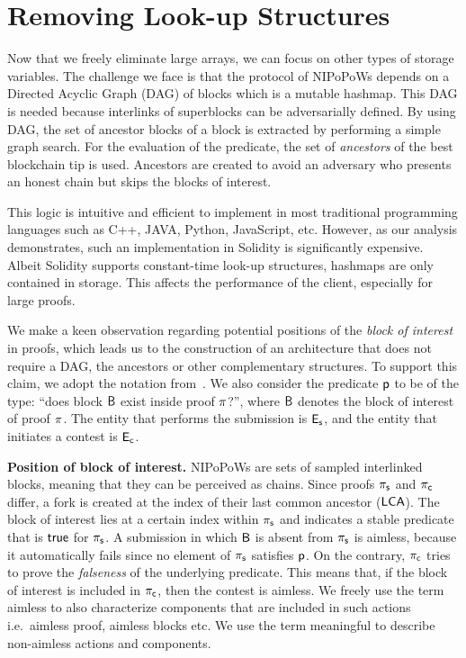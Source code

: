 \section{Removing Look-up Structures}

Now that we freely eliminate large arrays, we can focus on other
types of storage variables. The challenge we face is that the protocol of
NIPoPoWs depends on a Directed Acyclic Graph (DAG) of blocks which is a
mutable hashmap. This DAG is needed because interlinks of superblocks can be
adversarially defined. By using DAG, the set of ancestor blocks of a block is
extracted by performing a simple graph search. For the evaluation of the
predicate, the set of \emph{ancestors} of the best blockchain tip is used.
Ancestors are created to avoid an adversary who presents an honest chain but
skips the blocks of interest.

This logic is intuitive and efficient to implement in most traditional
programming languages such as C++, JAVA, Python, JavaScript, etc. However, as
our analysis demonstrates, such an implementation in Solidity is significantly
expensive. Albeit Solidity supports constant-time look-up structures, hashmaps
are only contained in storage. This affects the performance of the client,
especially for large proofs.

We make a keen observation regarding potential positions of the \emph{block of
interest} in proofs, which leads us to the construction of an architecture that
does not require a DAG, the ancestors or other complementary structures. To
support this claim, we adopt the notation from~\cite{nipopows}. We also
consider the predicate $\mathsf{p}$ to be of the type: ``does block $\mathsf{B}$ exist
inside proof $\mathsf{\pi}$?'', where $\mathsf{B}$ denotes the block of interest of proof
$\mathsf{\pi}$. The entity that performs the submission is $\mathsf{E_{s}}$, and the entity that
initiates a contest is $\mathsf{E_{c}}$.

\noindent \textbf{Position of block of interest.} NIPoPoWs are sets of sampled
interlinked blocks, meaning that they can be perceived as chains. Since proofs
$\mathsf{\pi_{s}}$ and $\mathsf{\pi_{c}}$ differ, a fork is created at the index of
their last common ancestor ($\mathsf{LCA}$). The block of interest lies at a certain
index within $\mathsf{\pi_{s}}$ and indicates a stable predicate~\cite{nipopows,generic-client}
that is $\textsf{true}$ for $\mathsf{\pi_{s}}$. A submission in which $\mathsf{B}$ is
absent from $\mathsf{\pi_{s}}$ is aimless, because it automatically fails since no element
of $\mathsf{\pi_{s}}$ satisfies $\mathsf{p}$. On the contrary, $\mathsf{\pi_{c}}$ tries to prove the
\emph{falseness} of the underlying predicate. This means that, if the block of
interest is included in $\mathsf{\pi_{c}}$, then the contest is aimless. We freely use the
term aimless to also characterize components that are included in such actions
i.e.\ aimless proof, aimless blocks etc. We use the term meaningful to describe
non-aimless actions and components.

